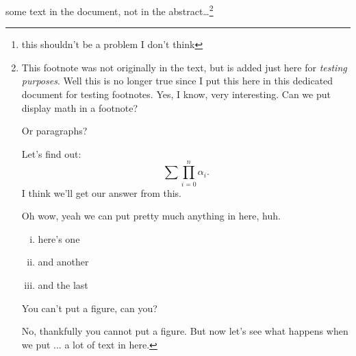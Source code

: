 \documentclass{amsart}
\title{}
\author{}
\begin{document}
\begin{abstract}
  some small abstract with a \dots footnote?\footnote{this shouldn't be a problem I don't think}
\end{abstract}

\maketitle

some text in the document, not in the abstract\dots\footnote[1234567890]{This footnote was not originally in the text, but is added just here for \emph{testing purposes}. Well this is no longer true since I put this here in this dedicated document for testing footnotes. Yes, I know, very interesting. Can we put display math in a footnote?

        Or paragraphs?

        Let's find out:
        \[
        \sum\prod^n_{i = 0} \alpha_i .
        \]
        I think we'll get our answer from this.

        Oh wow, yeah we can put pretty much anything in here, huh.
        \begin{enumerate}[(i)]
        \item here's one
        \item and another
        \item and the last
        \end{enumerate}

        You can't put a figure, can you?

        No, thankfully you cannot put a figure. But now let's see what happens when we put ... a lot of text in here.

}
\end{document}
